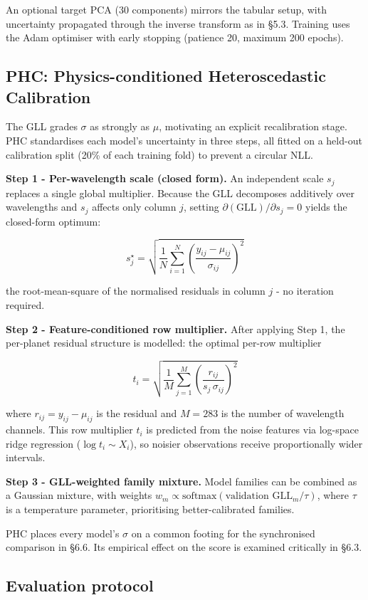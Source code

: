 \documentclass[12pt]{article}
\begin{document}
An optional target PCA (30 components) mirrors the tabular setup, with uncertainty propagated through the inverse transform as in \S{}5.3. Training uses the Adam optimiser with early stopping (patience 20, maximum 200 epochs).

\subsection{PHC: Physics-conditioned Heteroscedastic Calibration}

The GLL grades $\sigma$ as strongly as $\mu$, motivating an explicit recalibration stage. PHC standardises each model's uncertainty in three steps, all fitted on a held-out calibration split (20\% of each training fold) to prevent a circular NLL.

\textbf{Step 1 - Per-wavelength scale (closed form).} An independent scale $s_j$ replaces a single global multiplier. Because the GLL decomposes additively over wavelengths and $s_j$ affects only column $j$, setting $\partial(\text{GLL})/\partial s_j = 0$ yields the closed-form optimum:

\[
\boxed{\;s_j^\star = \sqrt{\frac{1}{N}\sum_{i=1}^N \left(\frac{y_{ij}-\mu_{ij}}{\sigma_{ij}}\right)^2}\;}
\]

the root-mean-square of the normalised residuals in column $j$ - no iteration required.

\textbf{Step 2 - Feature-conditioned row multiplier.} After applying Step 1, the per-planet residual structure is modelled: the optimal per-row multiplier

\[
t_i = \sqrt{\frac{1}{M}\sum_{j=1}^M \left(\frac{r_{ij}}{s_j\,\sigma_{ij}}\right)^2}
\]

where $r_{ij} = y_{ij} - \mu_{ij}$ is the residual and $M = 283$ is the number of wavelength channels. This row multiplier $t_i$ is predicted from the noise features via log-space ridge regression ($\log t_i \sim X_i$), so noisier observations receive proportionally wider intervals.

\textbf{Step 3 - GLL-weighted family mixture.} Model families can be combined as a Gaussian mixture, with weights $w_m \propto \mathrm{softmax}(\text{validation GLL}_m / \tau)$, where $\tau$ is a temperature parameter, prioritising better-calibrated families.

PHC places every model's $\sigma$ on a common footing for the synchronised comparison in \S{}6.6. Its empirical effect on the score is examined critically in \S{}6.3.

\subsection{Evaluation protocol}
\end{document}
